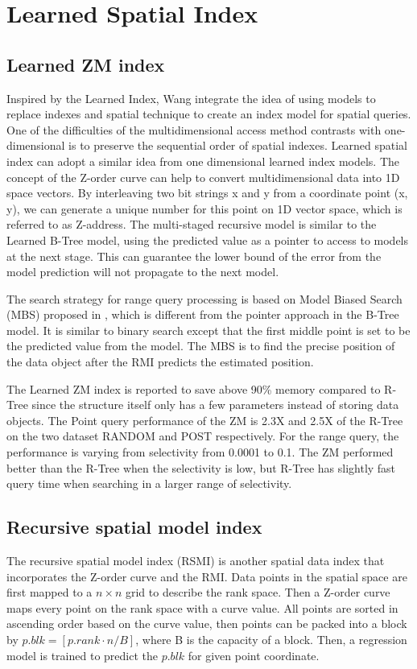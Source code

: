 \section{Learned Spatial Index}
\subsection{Learned ZM index}
Inspired by the Learned Index, Wang \cite{Wang:2019ks} integrate the idea of using models to replace indexes and spatial technique to create an index model for spatial queries. One of the difficulties of the multidimensional access method contrasts with one-dimensional is to preserve the sequential order of spatial indexes. Learned spatial index can adopt a similar idea from one dimensional learned index models. The concept of the Z-order curve can help to convert multidimensional data into 1D space vectors. By interleaving two bit strings x and y from a coordinate point (x, y), we can generate a unique number for this point on 1D vector space, which is referred to as Z-address. The multi-staged recursive model is similar to the Learned B-Tree model, using the predicted value as a pointer to access to models at the next stage. This can guarantee the lower bound of the error from the model prediction will not propagate to the next model. 

The search strategy for range query processing is based on Model Biased Search (MBS) proposed in \cite{Kafle:2017dy}, which is different from the pointer approach in the B-Tree model. It is similar to binary search except that the first middle point is set to be the predicted value from the model.  The MBS is to find the precise position of the data object after the RMI predicts the estimated position.

The Learned ZM index is reported to save above 90\% memory compared to R-Tree since the structure itself only has a few parameters instead of storing data objects. The Point query performance of the ZM is 2.3X and 2.5X of the R-Tree on the two dataset RANDOM and POST respectively. For the range query, the performance is varying from selectivity from 0.0001 to 0.1. The ZM performed better than the R-Tree when the selectivity is low, but R-Tree has slightly fast query time when searching in a larger range of selectivity. 



\subsection{Recursive spatial model index}
The recursive spatial model index (RSMI) \cite{Qi:2020uz} is another spatial data index that incorporates the Z-order curve and the RMI. Data points in the spatial space are first mapped to a $n \times n$ grid to describe the rank space. Then a Z-order curve maps every point on the rank space with a curve value. All points are sorted in ascending order based on the curve value, then points can be packed into a block by $p.blk = [p.rank \cdot n/B]$, where B is the capacity of a block. Then, a regression model is trained to predict the $p.blk$ for given point coordinate. 


